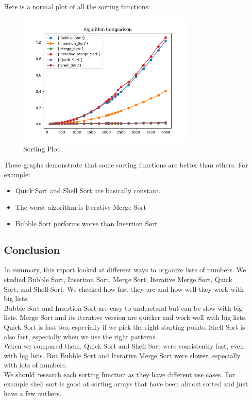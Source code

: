 \documentclass{article}
\begin{document}
Here is a normal plot of all the sorting functions:
\begin{figure}[H]
    \centering
    \includegraphics*[width=0.8\textwidth]{img/plot_combined.png}
    \caption{Sorting Plot}
\end{figure}

These graphs demonstrate that some sorting functions are better than others. For example:
\begin{itemize}
    \item Quick Sort and Shell Sort are basically constant.
    \item The worst algorithm is Iterative Merge Sort
    \item Bubble Sort performs worse than Insertion Sort
\end{itemize}

\vspace{\baselineskip}
\subsection{Conclusion}
In summary, this report looked at different ways to organize lists of numbers. We studied Bubble Sort, Insertion Sort, Merge Sort, Iterative Merge Sort, Quick Sort, and Shell Sort. We checked how fast they are and how well they work with big lists. \\

Bubble Sort and Insertion Sort are easy to understand but can be slow with big lists. Merge Sort and its iterative version are quicker and work well with big lists. Quick Sort is fast too, especially if we pick the right starting points. Shell Sort is also fast, especially when we use the right patterns. \\

When we compared them, Quick Sort and Shell Sort were consistently fast, even with big lists. But Bubble Sort and Iterative Merge Sort were slower, especially with lots of numbers. \\

We should research each sorting function as they have different use cases. For example shell sort is good at sorting arrays that have been almost sorted and just have a few outliers.
\end{document}
